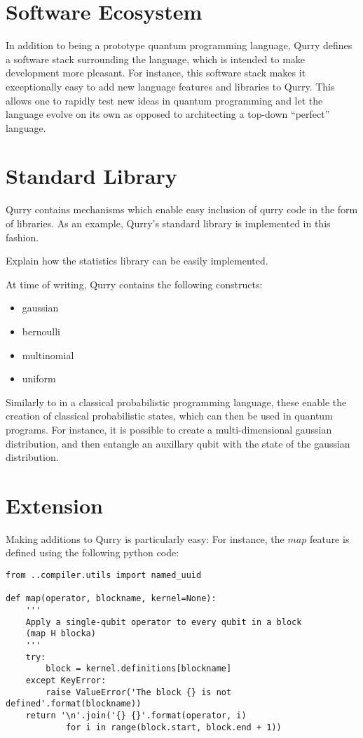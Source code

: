 \documentclass[journal]{article}
\begin{document}
\section{Software Ecosystem}

In addition to being a prototype quantum programming language, Qurry defines a software stack surrounding the language, which is intended to make development more pleasant.
For instance, this software stack makes it exceptionally easy to add new language features and libraries to Qurry.
This allows one to rapidly test new ideas in quantum programming and let the language evolve on its own as opposed to architecting a top-down ``perfect'' language.

\section{Standard Library}

    Qurry contains mechanisms which enable easy inclusion of qurry code in the form of libraries.
    As an example, Qurry's standard library is implemented in this fashion.

    Explain how the statistics library can be easily implemented.

    At time of writing, Qurry contains the following constructs:  	
    \begin{itemize}
	    \item gaussian 	
        \item bernoulli
	    \item multinomial 	
	    \item uniform
    \end{itemize}

    Similarly to in a classical probabilistic programming language, these enable the creation of classical probabilistic states, which can then be used in quantum programs.
    For instance, it is possible to create a multi-dimensional gaussian distribution, and then entangle an auxillary qubit with the state of the gaussian distribution.

    \section{Extension}

    Making additions to Qurry is particularly easy:
    For instance, the $map$ feature is defined using the following python code:

    \begin{verbatim}
from ..compiler.utils import named_uuid

def map(operator, blockname, kernel=None):
    '''
    Apply a single-qubit operator to every qubit in a block
    (map H blocka)
    '''
    try:
        block = kernel.definitions[blockname]
    except KeyError:
        raise ValueError('The block {} is not defined'.format(blockname))
    return '\n'.join('{} {}'.format(operator, i)
            for i in range(block.start, block.end + 1))
    \end{verbatim}
\end{document}
